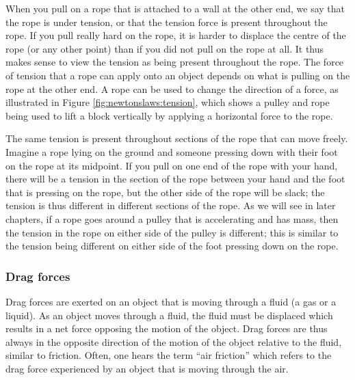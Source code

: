When you pull on a rope that is attached to a wall at the other end, we say that the rope is under tension, or that the tension force is present throughout the rope. If you pull really hard on the rope, it is harder to displace the centre of the rope (or any other point) than if you did not pull on the rope at all. It thus makes sense to view the tension as being present throughout the rope. The force of tension that a rope can apply onto an object depends on what is pulling on the rope at the other end. A rope can be used to change the direction of a force, as illustrated in Figure \ref{fig:newtonslaws:tension}, which shows a pulley and rope being used to lift a block vertically by applying a horizontal force to the rope.
 

The same tension is present throughout sections of the rope that can move freely. Imagine a rope lying on the ground and someone pressing down with their foot on the rope at its midpoint. If you pull on one end of the rope with your hand, there will be a tension in the section of the rope between your hand and the foot that is pressing on the rope, but the other side of the rope will be slack; the tension is thus different in different sections of the rope. As we will see in later chapters, if a rope goes around a pulley that is accelerating and has mass, then the tension in the rope on either side of the pulley is different; this is similar to the tension being different on either side of the foot pressing down on the rope. 

\subsubsection{Drag forces}
Drag forces are exerted on an object that is moving through a fluid (a gas or a liquid). As an object moves through a fluid, the fluid must be displaced which results in a net force opposing the motion of the object. Drag forces are thus always in the opposite direction of the motion of the object relative to the fluid, similar to friction. Often, one hears the term ``air friction'' which refers to the drag force experienced by an object that is moving through the air. 

